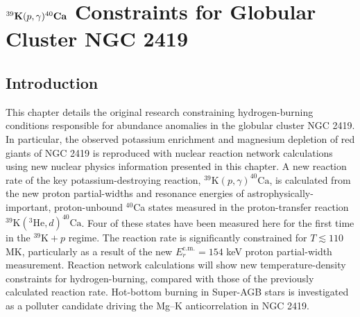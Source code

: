 \chapter{\texorpdfstring{$^{39}\mathrm{\textbf{K}}(\MakeLowercase{p},\gamma)^{40}\mathrm{\textbf{C\MakeLowercase{a}}}$}{39K(p,g)40Ca} Constraints for Globular Cluster NGC 2419}
\label{ch:GC}

\section{Introduction}


This chapter details the original research constraining hydrogen-burning conditions responsible for abundance anomalies in the globular cluster NGC 2419. In particular, the observed potassium enrichment and magnesium depletion of red giants of NGC 2419 is reproduced with nuclear reaction network calculations using new nuclear physics information presented in this chapter. A new reaction rate of the key potassium-destroying reaction, $^{39}\mathrm{K}(p,\gamma)^{40}\mathrm{Ca}$, is calculated from the new proton partial-widths and resonance energies of astrophysically-important, proton-unbound $^{40}$Ca states measured in the proton-transfer reaction $^{39}\mathrm{K}(^{3}\mathrm{He},d)^{40}\mathrm{Ca}$. Four of these states have been measured here for the first time in the $^{39}\mathrm{K}+p$ regime. The reaction rate is significantly constrained for $T \lesssim 110$ MK, particularly as a result of the new $E_{r}^{\mathrm{c.m.}} = 154$ keV proton partial-width measurement. Reaction network calculations will show new temperature-density constraints for hydrogen-burning, compared with those of the previously calculated reaction rate. Hot-bottom burning in Super-AGB stars is investigated as a polluter candidate driving the Mg--K anticorrelation in NGC 2419.

